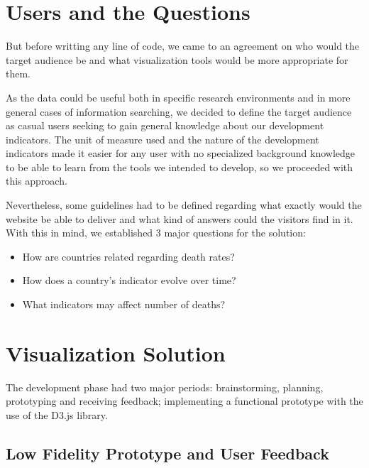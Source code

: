 \documentclass[conference]{IEEEtran}
\begin{document}
\section{Users and the Questions}

But before writting any line of code, we came to an agreement on who would the 
target audience be and what visualization tools would be more appropriate for them.


As the data could be useful both in specific research environments and in more
general cases of information searching, we decided to define the target audience
as casual users seeking to gain general knowledge about our development indicators.
The unit of measure used and the nature of the development indicators made it
easier for any user with no specialized background knowledge to be able to learn
from the tools we intended to develop, so we proceeded with this approach.


Nevertheless, some guidelines had to be defined regarding what exactly would
the website be able to deliver and what kind of answers could the visitors find in it.
With this in mind, we established 3 major questions for the solution:
\begin{itemize}
    \item How are countries related regarding death rates?
    \item How does a country's indicator evolve over time?
    \item What indicators may affect number of deaths?
\end{itemize}

\section{Visualization Solution}

The development phase had two major periods: 
brainstorming, planning, prototyping and receiving feedback;
implementing a functional prototype with the use of the D3.js library.

\subsection{Low Fidelity Prototype and User Feedback}
\end{document}
